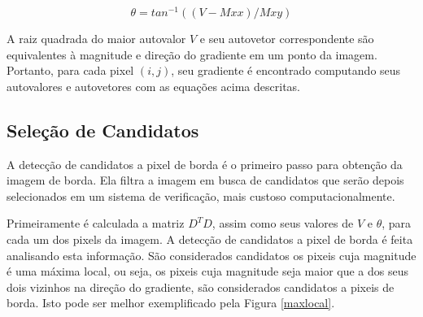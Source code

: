\begin{equation}
\theta = tan^{-1}((V-Mxx)/Mxy)
\end{equation}

A raiz quadrada do maior autovalor $V$ e seu autovetor correspondente são equivalentes à magnitude e direção do gradiente em um ponto da imagem. Portanto, para cada pixel $(i,j)$, seu gradiente é encontrado computando seus autovalores e autovetores com as equações acima descritas.



\subsection{Seleção de Candidatos} \label{met:bordasele}


A detecção de candidatos a pixel de borda é o primeiro passo para obtenção da imagem de borda. Ela filtra a imagem em busca de candidatos que serão depois selecionados em um sistema de verificação, mais custoso computacionalmente.

Primeiramente é calculada a matriz $D^TD$, assim como seus valores de $V$ e $\theta$, para cada um dos pixels da imagem. A detecção de candidatos a pixel de borda é feita analisando esta informação. São considerados candidatos os pixeis cuja magnitude é uma máxima local, ou seja, os pixeis cuja magnitude seja maior que a dos seus dois vizinhos na direção do gradiente, são considerados candidatos a pixeis de borda. Isto pode ser melhor exemplificado pela Figura \ref{maxlocal}.


